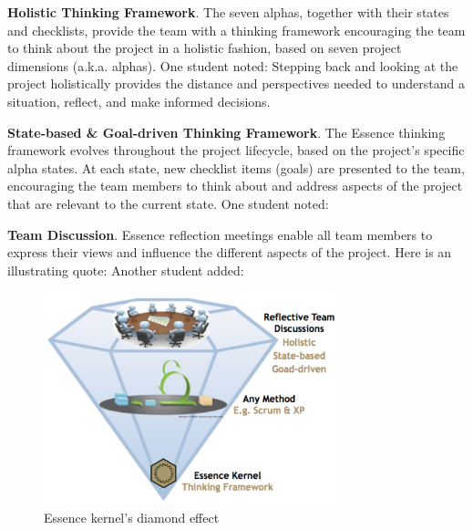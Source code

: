 \textbf{Holistic Thinking Framework}. The seven alphas, together with their states and checklists, provide the team with a thinking framework encouraging the team to think about the project in a holistic fashion, based on seven project dimensions (a.k.a. alphas). One student noted:  Stepping back and looking at the project holistically provides the distance and perspectives needed to understand a situation, reflect, and make informed decisions.

\textbf{State-based \& Goal-driven Thinking Framework}. The Essence thinking framework evolves throughout the project lifecycle, based on the project's specific alpha states. At each state, new checklist items (goals) are presented to the team, encouraging the team members to think about and address aspects of the project that are relevant to the current state. One student noted: 

\textbf{Team Discussion}. Essence reflection meetings enable all team members to express their views and influence the different aspects of the project. Here is an illustrating quote:  Another student added: 

\begin{figure}[t]
\centering
\includegraphics[width=3.4in]{reflection_meeting_images/EssenceDiamondEffect.png}
\caption{ Essence kernel's diamond effect}
\label{EssenceDiamondEffect}
\end{figure}

